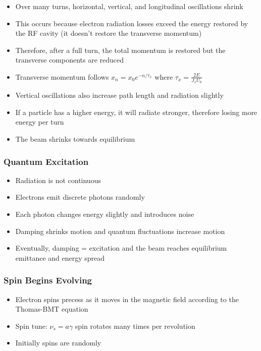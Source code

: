\documentclass{article}
\begin{document}
\begin{itemize}
\item Over many turns, horizontal, vertical, and longitudinal oscillations shrink
\item This occurs because electron radiation losses exceed the energy restored by the RF cavity (it doesn't restore the transverse momentum)
\item Therefore, after a full turn, the total momentum is restored but the transverse components are reduced
\item Transverse momentum follows $x_n=x_0e^{-n/\tau_x}$ where $\tau_x=\frac{2E}{J_x U_0}$
\item Vertical oscillations also increase path length and radiation slightly
\item If a particle has a higher energy, it will radiate stronger, therefore losing more energy per turn
\item The beam shrinks towards equilibrium
\end{itemize}

\subsubsection{Quantum Excitation}
\begin{itemize}
\item Radiation is not continuous
\item Electrons emit discrete photons randomly
\item Each photon changes energy slightly and introduces noise
\item Damping shrinks motion and quantum fluctuations increase motion
\item Eventually, damping = excitation and the beam reaches equilibrium emittance and energy spread
\end{itemize}

\subsubsection{Spin Begins Evolving}
\begin{itemize}
\item Electron spins precess as it moves in the magnetic field according to the Thomas-BMT equation
\item Spin tune: $\nu_s=a\gamma$ spin rotates many times per revolution 
\item Initially spins are randomly
\end{itemize}
\end{document}
